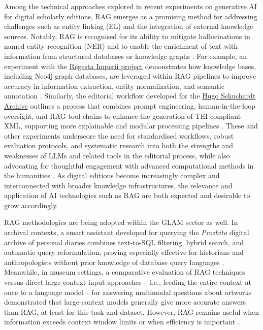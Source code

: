 \begin{spacing}{1.5}
Among the technical approaches explored in recent experiments on generative AI for digital scholarly editions, RAG emerges as a promising method for addressing challenges such as entity linking (EL) and the integration of external knowledge sources. Notably, RAG is recognised for its ability to mitigate hallucinations in named entity recognition (NER) and to enable the enrichment of text with information from structured databases or knowledge graphs \citep{pollin_when_2025}. For example, an experiment with the \href{https://www.regesta-imperii.de/en/home.html}{Regesta Imperii project}\nocite{noauthor_home_nodate} demonstrates how knowledge bases, including Neo4j graph databases, are leveraged within RAG pipelines to improve accuracy in information extraction, entity normalization, and semantic annotation \citep{kuczera_chatgpt_2024}. Similarly, the editorial workflow developed for the \href{https://web.archive.org/web/20241120122545/https://gams.uni-graz.at/context:hsa}{Hugo Schuchardt Archive} outlines a process that combines prompt engineering, human-in-the-loop oversight, and RAG tool chains to enhance the generation of TEI-compliant XML, supporting more explainable and modular processing pipelines \citep{pollin_new_2023}. These and other experiments underscore the need for standardised workflows, robust evaluation protocols, and systematic research into both the strengths and weaknesses of LLMs and related tools in the editorial process, while also advocating for thoughtful engagement with advanced computational methods in the humanities \citep{pollin_workshop_2024}. As digital editions become increasingly complex and interconnected with broader knowledge infrastructures, the relevance and application of AI technologies such as RAG are both expected and desirable to grow accordingly.

RAG methodologies are being adopted within the GLAM sector as well. In archival contexts, a smart assistant developed for querying the \textit{Prozhito} digital archive of personal diaries combines text-to-SQL filtering, hybrid search, and automatic query reformulation, proving especially effective for historians and anthropologists without prior knowledge of database query languages  \citep{sergeev_talking_2025}. Meanwhile, in museum settings, a comparative evaluation of RAG techniques versus direct large-context input approaches -- i.e., feeding the entire context at once to a language model -- for answering multimodal questions about artworks demonstrated that large-context models generally give more accurate answers than RAG, at least for this task and dataset. However, RAG remains useful when information exceeds context window limits or when efficiency is important \citep{ramos-varela_context_2025}.


\end{spacing}
